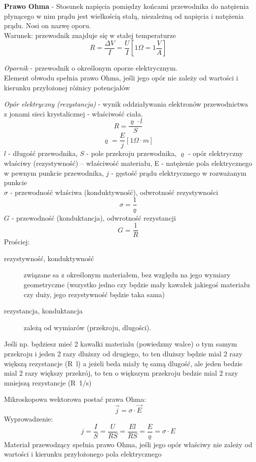 \documentclass[a4paper,11pt]{article}
\begin{document}
\textbf{Prawo Ohma} - Stosunek napięcia pomiędzy końcami przewodnika do natężenia płynącego w nim prądu jest wielkością stałą, niezależną od napięcia i natężenia prądu. Nosi on nazwę oporu.\\
Warunek: przewodnik znajduje się w stałej temperaturze
$$R=\frac{\Delta V}{I}=\frac{U}{I}\left[1\Omega=1\frac{V}{A}\right]$$

\emph{Opornik} - przewodnik o określonym oporze elektrycznym.\\
Element obwodu spełnia prawo Ohma, jeśli jego opór nie zależy od wartości i kierunku przyłożonej różnicy potencjałów

\emph{Opór elektryczny (rezystancja)} - wynik oddziaływania elektronów przewodnictwa z jonami sieci krystalicznej - właściwość ciała. 
$$R=\frac{\upvarrho\cdot l}{S}$$
$$ \upvarrho =\frac{E}{j}\left[1\Omega\cdot m\right]$$
$l$ - długość przewodnika, $S$ - pole przekroju przewodnika, $\upvarrho$ - opór elektryczny właściwy (rezystywność) -- właściwość materiału, E - natężenie pola elektrycznego w pewnym punkcie przewodnika, $j$ - gęstość prądu elektrycznego w rozważanym punkcie\\
$\sigma$ - przewodność właściwa (konduktywność), odwrotność rezystywności
$$\sigma = \frac{1}{\upvarrho}$$
$G$ - przewodność (konduktancja), odwrotność rezystancji
$$G=\frac{1}{R}$$
Prościej:
\begin{description}
\item[rezystywność, konduktywność] związane sa z określonym materiałem, bez względu na jego wymiary geometryczne (wszystko jedno czy będzie mały kawałek jakiegoś materiału czy duży, jego rezystywność będzie taka sama)

\item[rezystancja, konduktancja] zależą od wymiarów (przekroju, dlugości). 
\end{description}
Jeśli np. będziesz mieć 2 kawalki materialu (powiedzmy walce) o tym samym przekroju i jeden 2 razy dluższy od drugiego, to ten dluższy będzie mial 2 razy większą rezystancje (R~l) a jeżeli beda miały tę samą dlugość, ale jeden bedzie mial 2 razy większy przekrój, to ten o większym przekroju bedzie mial 2 razy mniejszą rezystancje (R~1/s) 

Mikroskopowa wektorowa postać prawa Ohma:
$$\vec{j}=\sigma\cdot\vec{E}$$
Wyprowadzenie:
$$j=\frac{I}{S} = \frac{U}{RS}=\frac{El}{RS}=\frac{E}{\upvarrho}=\sigma\cdot E$$
Materiał przewodzący spełnia prawo Ohma, jeśli jego opór właściwy nie zależy od wartości i kierunku przyłożonego pola elektrycznego
\end{document}
